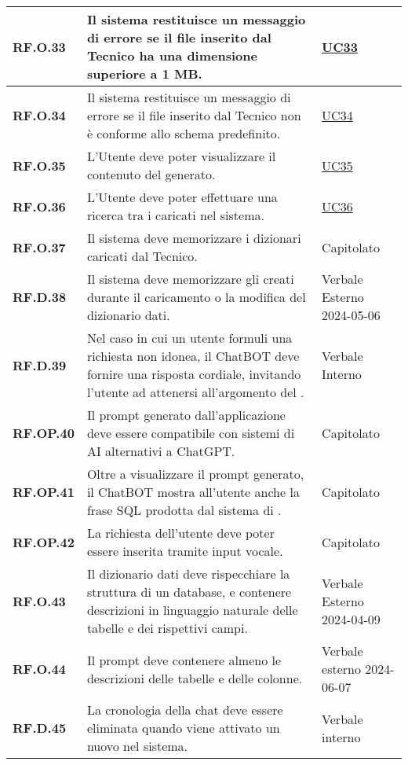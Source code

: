 \begin{longtable}{|P{3cm}|P{6,5cm}|>{\arraybackslash}P{4cm}|}
    \hline
    \textbf{RF.O.33} & Il sistema restituisce un messaggio di errore se il file inserito dal Tecnico ha una dimensione superiore a 1 MB. & \hyperref[UC33]{UC33} \\
    \hline
    \textbf{RF.O.34} & Il sistema restituisce un messaggio di errore se il file inserito dal Tecnico non è conforme allo schema predefinito. & \hyperref[UC34]{UC34} \\
    \hline
    \textbf{RF.O.35} & L'Utente deve poter visualizzare il contenuto del  generato. & \hyperref[UC35]{UC35} \\
    \hline
    \textbf{RF.O.36} & L'Utente deve poter effettuare una ricerca tra i  caricati nel sistema. & \hyperref[UC36]{UC36} \\
    \hline
    \textbf{RF.O.37} & Il sistema deve memorizzare i dizionari caricati dal Tecnico. & Capitolato \\
    \hline
    \textbf{RF.D.38} & Il sistema deve memorizzare gli  creati durante il caricamento o la modifica del dizionario dati. & Verbale Esterno 2024-05-06 \\
    \hline
    \textbf{RF.D.39} & Nel caso in cui un utente formuli una richiesta non idonea, il ChatBOT deve fornire una risposta cordiale, invitando l'utente ad attenersi all'argomento del . & Verbale Interno \\
    \hline
    \textbf{RF.OP.40} & Il prompt generato dall'applicazione deve essere compatibile con sistemi di AI alternativi a ChatGPT. & Capitolato \\
    \hline
    \textbf{RF.OP.41} & Oltre a visualizzare il prompt generato, il ChatBOT mostra all'utente anche la frase SQL prodotta dal sistema di . & Capitolato \\
    \hline
    \textbf{RF.OP.42} & La richiesta dell'utente deve poter essere inserita tramite input vocale. & Capitolato \\
    \hline
    \textbf{RF.O.43} & Il dizionario dati deve rispecchiare la struttura di un database, e contenere descrizioni in linguaggio naturale delle tabelle e dei rispettivi campi. & Verbale Esterno 2024-04-09 \\
    \hline
    \textbf{RF.O.44} & Il prompt deve contenere almeno le descrizioni delle tabelle e delle colonne. & Verbale esterno 2024-06-07 \\
    \hline
    \textbf{RF.D.45} & La cronologia della chat deve essere eliminata quando viene attivato un nuovo  nel sistema. & Verbale interno \\

\end{longtable}
